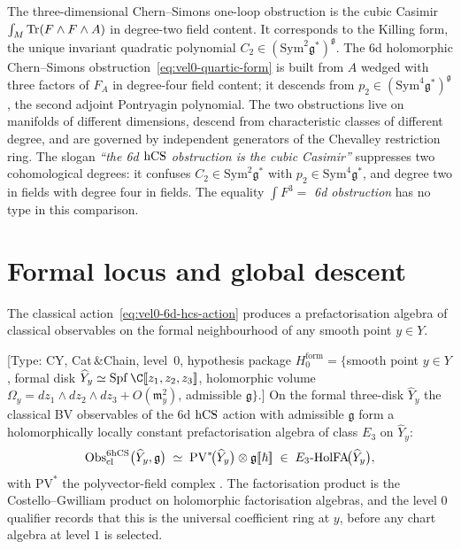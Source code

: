 \begin{remark}
\label{rem:vel0-not-3d}
The three-dimensional Chern--Simons one-loop obstruction is the
cubic Casimir $\int_M \operatorname{Tr}(F \wedge F \wedge A)$ in degree-two field
content. It corresponds to the Killing form, the unique invariant
quadratic polynomial $C_2 \in (\mathrm{Sym}^2 \mathfrak{g}^*)^\mathfrak{g}$.
The 6d holomorphic Chern--Simons obstruction~\eqref{eq:vel0-quartic-form}
is built from $A$ wedged with three factors of $F_A$ in degree-four
field content; it descends from $p_2 \in (\mathrm{Sym}^4 \mathfrak{g}^*)^\mathfrak{g}$,
the second adjoint Pontryagin polynomial. The two obstructions live on
manifolds of different dimensions, descend from characteristic classes
of different degree, and are governed by independent generators of the
Chevalley restriction ring. The slogan
\emph{``the 6d $\mathrm{hCS}$ obstruction is the cubic Casimir''}
suppresses two cohomological degrees: it confuses
$C_2 \in \mathrm{Sym}^2 \mathfrak{g}^*$ with $p_2 \in \mathrm{Sym}^4 \mathfrak{g}^*$, and degree two in
fields with degree four in fields. The equality
$\int F^3 = $ \emph{6d obstruction} has no type in this comparison.
\end{remark}

\section{Formal locus and global descent}
\label{sec:vel0-formal-global}

The classical action~\eqref{eq:vel0-6d-hcs-action} produces a
prefactorisation algebra of classical observables on the formal
neighbourhood of any smooth point $y \in Y$.

\begin{proposition}
\label{prop:vel0-formal-locus}
\textup{[Type: CY, Cat$\,\&$Chain, level~$0$, hypothesis package
$H_0^{\mathrm{form}} = \{$smooth point $y \in Y$, formal disk
$\widehat{Y}_y \simeq \mathrm{Spf}\,\C[\![z_1, z_2, z_3]\!]$,
holomorphic volume $\Omega_y = dz_1 \wedge dz_2 \wedge dz_3 + O(\mathfrak m_y^2)$,
admissible $\mathfrak{g}\}$.]}
On the formal three-disk $\widehat{Y}_y$ the classical BV observables of
the 6d $\mathrm{hCS}$ action with admissible $\mathfrak{g}$ form a
holomorphically locally constant prefactorisation algebra of class
$E_3$ on $\widehat{Y}_y$:
\begin{equation}
\label{eq:vel0-formal-fa}
\mathrm{Obs}^{6\mathrm{hCS}}_{\mathrm{cl}}\bigl(\widehat{Y}_y, \mathfrak g\bigr)
\;\simeq\;
\mathrm{PV}^*\!\bigl(\widehat{Y}_y\bigr) \otimes \mathfrak{g}[\![\hbar]\!]
\;\in\; E_3\text{-}\mathrm{HolFA}\!\bigl(\widehat{Y}_y\bigr),
\end{equation}
with $\mathrm{PV}^*$ the polyvector-field complex
\cite{BCOV93,CostelloLi2020}.
The factorisation product is the Costello--Gwilliam product on
holomorphic factorisation algebras, and the level $0$ qualifier records
that this is the universal coefficient ring at $y$, before any chart
algebra at level $1$ is selected.
\end{proposition}

